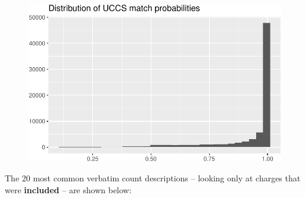 \documentclass[
  letterpaper,
  DIV=11,
  numbers=noendperiod]{scrartcl}
\begin{document}
\begin{figure}

{\centering \includegraphics{hb2153_files/figure-pdf/probability-distribution-1.pdf}

}

\end{figure}

The 20 most common verbatim count descriptions -- looking only at
charges that were \textbf{included} -- are shown below:
\end{document}
